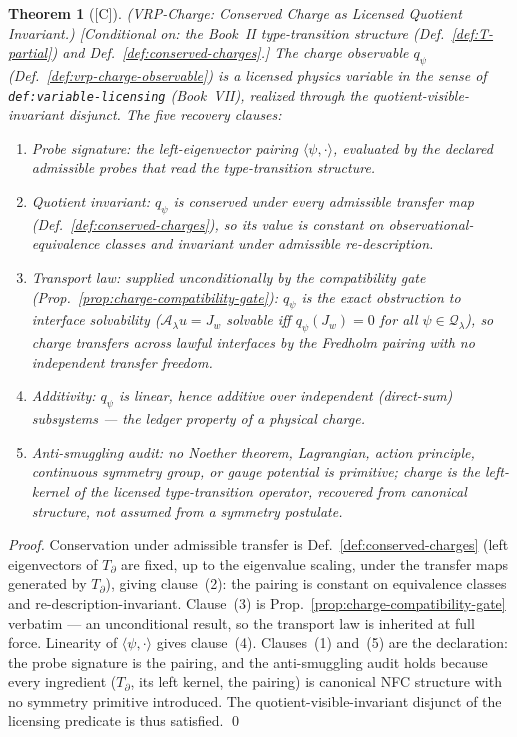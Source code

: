 \documentclass[12pt,oneside]{amsbook}
\theoremstyle{plain}
\newtheorem{theorem}{Theorem}[section]
\theoremstyle{definition}
\theoremstyle{remark}
\newcommand{\status}[1]{\textup{[#1]}}
\begin{document}
\begin{theorem}[\status{C}]\label{thm:vrp-charge}
\textup{(VRP-Charge: Conserved Charge as Licensed Quotient Invariant.)}
\textup{[Conditional on: the Book~II type-transition structure
(Def.~\ref{def:T-partial}) and Def.~\ref{def:conserved-charges}.]}
The charge observable $q_\psi$ (Def.~\ref{def:vrp-charge-observable})
is a licensed physics variable in the sense of
\texttt{def:variable-licensing} (Book~VII), realized through the
quotient-visible-invariant disjunct.  The five recovery clauses:
\begin{enumerate}[label=\textup{(\arabic*)}]
  \item \emph{Probe signature:} the left-eigenvector pairing
    $\langle\psi,\cdot\rangle$, evaluated by the declared admissible
    probes that read the type-transition structure.
  \item \emph{Quotient invariant:} $q_\psi$ is conserved under every
    admissible transfer map (Def.~\ref{def:conserved-charges}), so its
    value is constant on observational-equivalence classes and
    invariant under admissible re-description.
  \item \emph{Transport law:} supplied unconditionally by the
    compatibility gate (Prop.~\ref{prop:charge-compatibility-gate}):
    $q_\psi$ is the exact obstruction to interface solvability
    ($\mathcal{A}_\lambda u = J_w$ solvable iff $q_\psi(J_w)=0$ for all
    $\psi\in\mathcal{Q}_\lambda$), so charge transfers across lawful
    interfaces by the Fredholm pairing with no independent transfer
    freedom.
  \item \emph{Additivity:} $q_\psi$ is linear, hence additive over
    independent (direct-sum) subsystems --- the ledger property of a
    physical charge.
  \item \emph{Anti-smuggling audit:} no Noether theorem, Lagrangian,
    action principle, continuous symmetry group, or gauge potential is
    primitive; charge is the left-kernel of the licensed
    type-transition operator, recovered from canonical structure, not
    assumed from a symmetry postulate.
\end{enumerate}
\end{theorem}

\begin{proof}
Conservation under admissible transfer is Def.~\ref{def:conserved-charges}
(left eigenvectors of $T_\partial$ are fixed, up to the eigenvalue
scaling, under the transfer maps generated by $T_\partial$), giving
clause~(2): the pairing is constant on equivalence classes and
re-description-invariant.  Clause~(3) is
Prop.~\ref{prop:charge-compatibility-gate} verbatim --- an
unconditional result, so the transport law is inherited at full
force.  Linearity of $\langle\psi,\cdot\rangle$ gives clause~(4).
Clauses~(1) and~(5) are the declaration: the probe signature is the
pairing, and the anti-smuggling audit holds because every ingredient
($T_\partial$, its left kernel, the pairing) is canonical NFC
structure with no symmetry primitive introduced.  The
quotient-visible-invariant disjunct of the licensing predicate is thus
satisfied. \qed
\end{proof}
\end{document}
